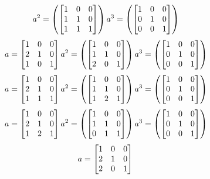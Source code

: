 \begin{mdframed}[style=darkAnswer,frametitle={Joe Starr}]
\begin{itemize}
{$$a^{ 2 }=\left( \begin{bmatrix}1&0&0\\1&1&0\\1&1&1\end{bmatrix} \right)
a^{ 3 }=\left( \begin{bmatrix}1&0&0\\0&1&0\\0&0&1\end{bmatrix} \right)
$$ $$
a= \begin{bmatrix}1&0&0\\2&1&0\\1&0&1\end{bmatrix} \\
a^{ 2 }=\left( \begin{bmatrix}1&0&0\\1&1&0\\2&0&1\end{bmatrix} \right)
a^{ 3 }=\left( \begin{bmatrix}1&0&0\\0&1&0\\0&0&1\end{bmatrix} \right)
$$ $$
a= \begin{bmatrix}1&0&0\\2&1&0\\1&1&1\end{bmatrix} \\
a^{ 2 }=\left( \begin{bmatrix}1&0&0\\1&1&0\\1&2&1\end{bmatrix} \right)
a^{ 3 }=\left( \begin{bmatrix}1&0&0\\0&1&0\\0&0&1\end{bmatrix} \right)
$$ $$
a= \begin{bmatrix}1&0&0\\2&1&0\\1&2&1\end{bmatrix} \\
a^{ 2 }=\left( \begin{bmatrix}1&0&0\\1&1&0\\0&1&1\end{bmatrix} \right)
a^{ 3 }=\left( \begin{bmatrix}1&0&0\\0&1&0\\0&0&1\end{bmatrix} \right)
$$ $$
a= \begin{bmatrix}1&0&0\\2&1&0\\2&0&1\end{bmatrix} \\
$$}
\end{itemize}
\end{mdframed}
